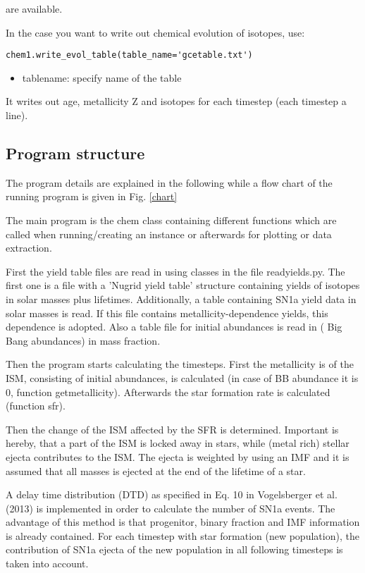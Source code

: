 {are available.



In the case you want to write out chemical evolution
of isotopes, use:

\begin{verbatim}
chem1.write_evol_table(table_name='gcetable.txt')
\end{verbatim}

\begin{itemize}
    \item table\textunderscore name:  specify name of the table
\end{itemize}

It writes out age, metallicity Z and isotopes
for each timestep (each timestep a line).

\subsection{Program structure}

The program details are explained in the following while
a flow chart of the running program is given in Fig. \ref{chart}

The main program is the chem class containing different
functions which are called when running/creating an instance
or afterwards for plotting or data extraction.

First the yield table files are read in using
classes in the file read\textunderscore yields.py.
The first one is a file with a 'Nugrid yield table' structure containing
yields of isotopes in solar masses plus lifetimes. Additionally,
a table containing SN1a yield data in solar masses is read.
If this file contains metallicity-dependence yields, this dependence
is adopted. Also a table file for initial abundances is read in (
Big Bang abundances) in mass fraction.

Then the program starts calculating the timesteps.
First the metallicity is of the ISM, consisting of initial abundances,
is calculated (in case of BB abundance it is 0, function getmetallicity).
Afterwards the star formation rate is calculated (function sfr).

Then the change of the ISM affected by the SFR is determined.
Important is hereby, that a part of the ISM is locked away in stars,
while (metal rich) stellar ejecta contributes to the ISM.
The ejecta is weighted by using an IMF and it is assumed
that all masses is ejected at the end of the lifetime of a star.


A delay time distribution (DTD) as specified
in Eq. 10 in Vogelsberger et al. (2013) is implemented in order
to calculate the number of SN1a events. The advantage of this
method is that progenitor, binary fraction and IMF information
is already contained. For each timestep with star formation
(new population), the contribution of SN1a ejecta of the
new population in all following timesteps is taken into account.


}
